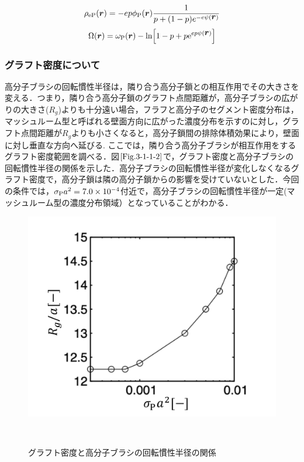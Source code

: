 \documentclass[10.5pt,a4j]{jarticle}
\newcommand{\bvec}[1]{
\mbox{\boldmath $#1$}
}%
\begin{document}
%
%
\begin{equation}
	\label{eq3-1-1}
	\rho_{\rm{eP}}(\bvec{r})=-ep\phi_{\rm{P}}(\bvec{r})\frac{1}{p+(1-p)e^{-e\psi(\bvec{r})}}
	\end{equation}
%
%
\begin{equation}
	\label{eq3-1-2}
	\Omega(\bvec{r})=\omega_{\rm{P}}(\bvec{r})-{\rm{ln}}\Bigl[1-p+p{\rm{e}}^{ep\psi(\bvec{r})}\Bigr]
	\end{equation}
%
\vspace{-10mm}
%
\subsubsection{グラフト密度について}
高分子ブラシの回転慣性半径は，隣り合う高分子鎖との相互作用でその大きさを変える．つまり，隣り合う高分子鎖のグラフト点間距離が，高分子ブラシの広がりの大きさ($R_g$)よりも十分遠い場合，フラフと高分子のセグメント密度分布は，マッシュルーム型と呼ばれる壁面方向に広がった濃度分布を示すのに対し，グラフト点間距離が$R_g$よりも小さくなると，高分子鎖間の排除体積効果により，壁面に対し垂直な方向へ延びる. ここでは，隣り合う高分子ブラシが相互作用をするグラフト密度範囲を調べる．図$\ref{Fig.3-1-1-2}$で，グラフト密度と高分子ブラシの回転慣性半径の関係を示した．高分子ブラシの回転慣性半径が変化しなくなるグラフト密度で，高分子鎖は隣の高分子鎖からの影響を受けていないとした．今回の条件では，$\sigma_{\rm{P}}a^2=7.0\times10^{-4}$付近で，高分子ブラシの回転慣性半径が一定(マッシュルーム型の濃度分布領域）となっていることがわかる．
\begin{figure}[H]
		\centering
            \includegraphics[keepaspectratio,scale=0.5]{Fig/Fig.7/sigma_Rg.pdf}
            \caption{グラフト密度と高分子ブラシの回転慣性半径の関係}
\            \label{Fig.3-1-1-2}
\end{figure}
\end{document}
